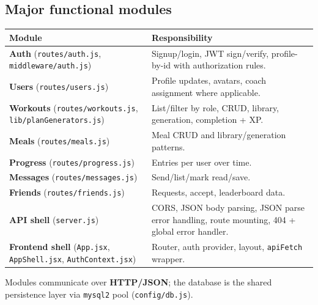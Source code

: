 \documentclass[11pt,letterpaper]{article}
\begin{document}
\subsection{Major functional modules}
\begin{longtable}{@{}p{1.9in}p{4.6in}@{}}
  \toprule
  \textbf{Module} & \textbf{Responsibility} \\
  \midrule
  \endhead
  \textbf{Auth} (\texttt{routes/auth.js}, \texttt{middleware/auth.js}) & Signup/login, JWT sign/verify, profile-by-id with authorization rules. \\
  \textbf{Users} (\texttt{routes/users.js}) & Profile updates, avatars, coach assignment where applicable. \\
  \textbf{Workouts} (\texttt{routes/workouts.js}, \texttt{lib/planGenerators.js}) & List/filter by role, CRUD, library, generation, completion + XP. \\
  \textbf{Meals} (\texttt{routes/meals.js}) & Meal CRUD and library/generation patterns. \\
  \textbf{Progress} (\texttt{routes/progress.js}) & Entries per user over time. \\
  \textbf{Messages} (\texttt{routes/messages.js}) & Send/list/mark read/save. \\
  \textbf{Friends} (\texttt{routes/friends.js}) & Requests, accept, leaderboard data. \\
  \textbf{API shell} (\texttt{server.js}) & CORS, JSON body parsing, JSON parse error handling, route mounting, 404 + global error handler. \\
  \textbf{Frontend shell} (\texttt{App.jsx}, \texttt{AppShell.jsx}, \texttt{AuthContext.jsx}) & Router, auth provider, layout, \texttt{apiFetch} wrapper. \\
  \bottomrule
\end{longtable}

Modules communicate over \textbf{HTTP/JSON}; the database is the shared persistence layer via \texttt{mysql2} pool (\texttt{config/db.js}).
\end{document}
